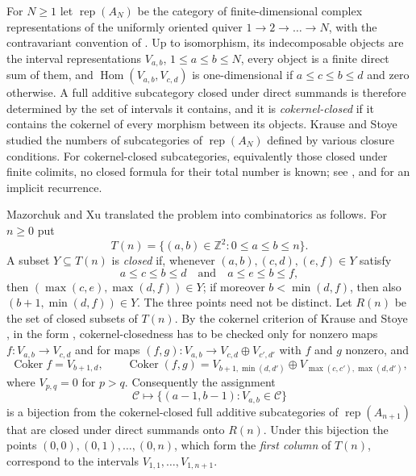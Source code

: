 \documentclass[11pt]{amsart}
\theoremstyle{definition}
\theoremstyle{remark}
\numberwithin{equation}{section}
\newcommand{\Z}{\mathbb{Z}}
\newcommand{\rep}{\operatorname{rep}}
\newcommand{\Coker}{\operatorname{Coker}}
\begin{document}
For $N\ge1$ let $\rep(A_N)$ be the category of finite-dimensional complex representations of the uniformly oriented quiver $1\to2\to\dots\to N$, with the contravariant convention of \cite{KS,MX}. Up to isomorphism, its indecomposable objects are the interval representations $V_{a,b}$, $1\le a\le b\le N$, every object is a finite direct sum of them, and $\operatorname{Hom}(V_{a,b},V_{c,d})$ is one-dimensional if $a\le c\le b\le d$ and zero otherwise. A full additive subcategory closed under direct summands is therefore determined by the set of intervals it contains, and it is \emph{cokernel-closed} if it contains the cokernel of every morphism between its objects. Krause and Stoye \cite{KS} studied the numbers of subcategories of $\rep(A_N)$ defined by various closure conditions. For cokernel-closed subcategories, equivalently those closed under finite colimits, no closed formula for their total number is known; see \cite[Section~3]{KS}, and \cite[Theorem~18]{MX} for an implicit recurrence.

Mazorchuk and Xu \cite{MX} translated the problem into combinatorics as follows. For $n\ge0$ put
\[
T(n)=\{(a,b)\in\Z^2: 0\le a\le b\le n\}.
\]
A subset $Y\subseteq T(n)$ is \emph{closed} if, whenever $(a,b),(c,d),(e,f)\in Y$ satisfy
\begin{equation}\label{eq:point-rule}
a\le c\le b\le d\quad\text{and}\quad a\le e\le b\le f,
\end{equation}
then $(\max(c,e),\max(d,f))\in Y$; if moreover $b<\min(d,f)$, then also $(b+1,\min(d,f))\in Y$. The three points need not be distinct. Let $R(n)$ be the set of closed subsets of $T(n)$. By the cokernel criterion of Krause and Stoye \cite[Lemma~7]{KS}, in the form \cite[Lemma~1]{MX}, cokernel-closedness has to be checked only for nonzero maps $f\colon V_{a,b}\to V_{c,d}$ and for maps $(f,g)\colon V_{a,b}\to V_{c,d}\oplus V_{c',d'}$ with $f$ and $g$ nonzero, and
\[
\Coker f=V_{b+1,d},\qquad\Coker(f,g)=V_{b+1,\min(d,d')}\oplus V_{\max(c,c'),\max(d,d')},
\]
where $V_{p,q}=0$ for $p>q$. Consequently \cite[Section~3.2]{MX} the assignment
\[
\mathcal C\longmapsto\{(a-1,b-1): V_{a,b}\in\mathcal C\}
\]
is a bijection from the cokernel-closed full additive subcategories of $\rep(A_{n+1})$ that are closed under direct summands onto $R(n)$. Under this bijection the points $(0,0),(0,1),\dots,(0,n)$, which form the \emph{first column} of $T(n)$, correspond to the intervals $V_{1,1},\dots,V_{1,n+1}$.
\end{document}
